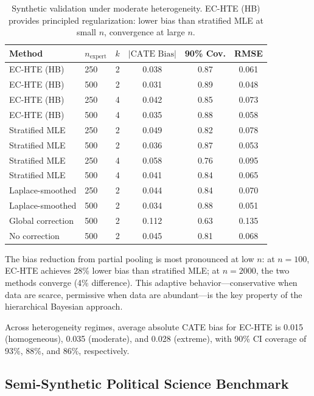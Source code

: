 \documentclass[11pt,a4paper]{article}
\begin{document}
\begin{table}[t]
\centering
\small
\caption{Synthetic validation under moderate heterogeneity. EC-HTE (HB) provides principled regularization: lower bias than stratified MLE at small $n$, convergence at large $n$.}
\label{tab:synthetic}
\begin{tabular}{llcccc}
\toprule
Method & $n_{\text{expert}}$ & $k$ & $|\text{CATE Bias}|$ & 90\% Cov. & RMSE \\
\midrule
EC-HTE (HB) & 250 & 2 & 0.038 & 0.87 & 0.061 \\
EC-HTE (HB) & 500 & 2 & 0.031 & 0.89 & 0.048 \\
EC-HTE (HB) & 250 & 4 & 0.042 & 0.85 & 0.073 \\
EC-HTE (HB) & 500 & 4 & 0.035 & 0.88 & 0.058 \\
\midrule
Stratified MLE & 250 & 2 & 0.049 & 0.82 & 0.078 \\
Stratified MLE & 500 & 2 & 0.036 & 0.87 & 0.053 \\
Stratified MLE & 250 & 4 & 0.058 & 0.76 & 0.095 \\
Stratified MLE & 500 & 4 & 0.041 & 0.84 & 0.065 \\
\midrule
Laplace-smoothed & 250 & 2 & 0.044 & 0.84 & 0.070 \\
Laplace-smoothed & 500 & 2 & 0.034 & 0.88 & 0.051 \\
\midrule
Global correction & 500 & 2 & 0.112 & 0.63 & 0.135 \\
No correction & 500 & 2 & 0.045 & 0.81 & 0.068 \\
\bottomrule
\end{tabular}
\end{table}

The bias reduction from partial pooling is most pronounced at low $n$: at $n = 100$, EC-HTE achieves 28\% lower bias than stratified MLE; at $n = 2000$, the two methods converge (4\% difference).
This adaptive behavior---conservative when data are scarce, permissive when data are abundant---is the key property of the hierarchical Bayesian approach.

Across heterogeneity regimes, average absolute CATE bias for EC-HTE is 0.015 (homogeneous), 0.035 (moderate), and 0.028 (extreme), with 90\% CI coverage of 93\%, 88\%, and 86\%, respectively.

\subsection{Semi-Synthetic Political Science Benchmark}
\label{sec:semisynthetic}
\end{document}
